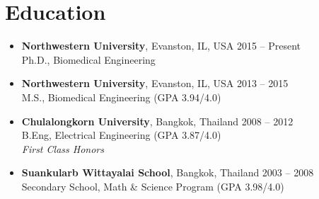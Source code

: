 \section{\sc Education}

\begin{itemize}[leftmargin=0cm, label={}]

\item {\bf Northwestern University}, Evanston, IL, USA 			\hfill 2015 -- Present \\
Ph.D., Biomedical Engineering

\item {\bf Northwestern University}, Evanston, IL, USA 			\hfill 2013 -- 2015 \\
M.S., Biomedical Engineering \hfill (GPA 3.94/4.0)

\item {\bf Chulalongkorn University}, Bangkok, Thailand 			\hfill 2008 -- 2012 \\
B.Eng, Electrical Engineering \hfill (GPA 3.87/4.0)\\
{\em First Class Honors}

\item {\bf Suankularb Wittayalai School}, Bangkok, Thailand 		\hfill 2003 -- 2008 \\
Secondary School, Math \& Science Program \hfill(GPA 3.98/4.0)

\end{itemize}
